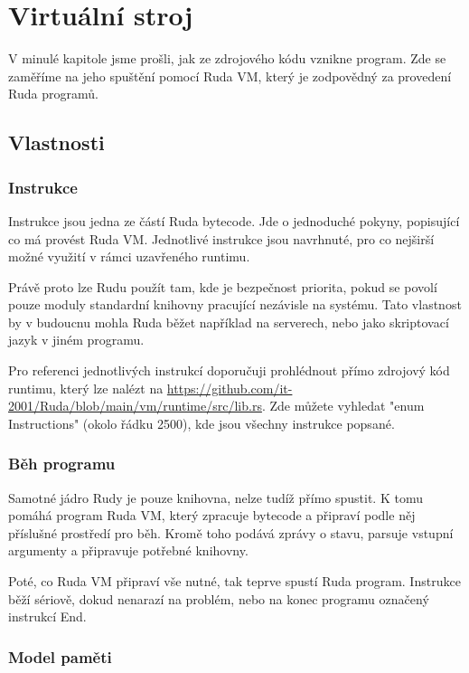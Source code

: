 \documentclass[12pt, a4paper,
twoside,        %
openright
]{report}
\let\oldchapter\chapter
\renewcommand{\chapter}{
	\clearpage
	\pagestyle{fancy}
	\oldchapter
}
\begin{document}
\chapter{Virtuální stroj}

V minulé kapitole jsme prošli, jak ze zdrojového kódu vznikne program. Zde se zaměříme na jeho spuštění pomocí Ruda VM, který je zodpovědný za provedení Ruda programů.

\section{Vlastnosti}

\subsection{Instrukce}

Instrukce jsou jedna ze částí Ruda bytecode. Jde o jednoduché pokyny, popisující co má provést Ruda VM. Jednotlivé instrukce jsou navrhnuté, pro co nejširší možné využití v rámci uzavřeného runtimu. 

Právě proto lze Rudu použít tam, kde je bezpečnost priorita, pokud se povolí pouze moduly standardní knihovny pracující nezávisle na systému. Tato vlastnost by v budoucnu mohla Ruda běžet například na serverech, nebo jako skriptovací jazyk v jiném programu.

Pro referenci jednotlivých instrukcí doporučuji prohlédnout přímo zdrojový kód runtimu, který lze nalézt na \url{https://github.com/it-2001/Ruda/blob/main/vm/runtime/src/lib.rs}. Zde můžete vyhledat "enum Instructions" (okolo řádku 2500), kde jsou všechny instrukce popsané.

\subsection{Běh programu}

Samotné jádro Rudy je pouze knihovna, nelze tudíž přímo spustit. K tomu pomáhá program Ruda VM, který zpracuje bytecode a připraví podle něj příslušné prostředí pro běh. Kromě toho podává zprávy o stavu, parsuje vstupní argumenty a připravuje potřebné knihovny.

Poté, co Ruda VM připraví vše nutné, tak teprve spustí Ruda program. Instrukce běží sériově, dokud nenarazí na problém, nebo na konec programu označený instrukcí End.

\clearpage
\subsection{Model paměti}
\end{document}
